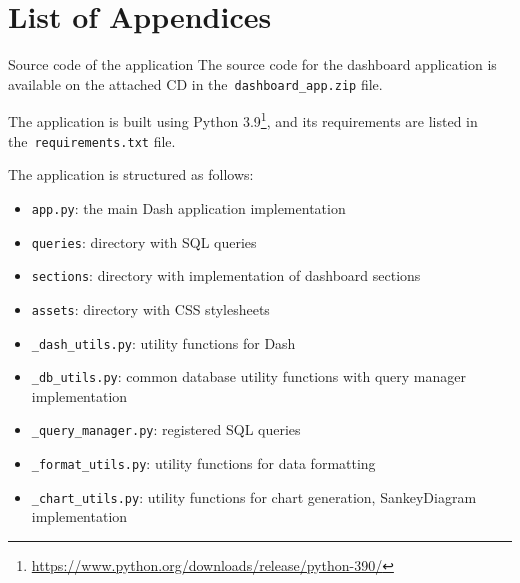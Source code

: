 \appendix
{}
\chapter*{List of Appendices}
\renewcommand{\thesection}{Appendix \Alph{section}}

\begin{section}{Source code of the application}
	\label{appendix:source-code}
	The source code for the dashboard application is available on the attached CD in the~\texttt{dashboard\_app.zip} file.

	The application is built using Python 3.9\footnote{\url{https://www.python.org/downloads/release/python-390/}}, and its requirements are listed in the~\texttt{requirements.txt} file.

	The application is structured as follows:
	\begin{itemize}
		\item \texttt{app.py}: the main Dash application implementation
		\item \texttt{queries\/}: directory with SQL queries
		\item \texttt{sections\/}: directory with implementation of dashboard sections
		\item \texttt{assets\/}: directory with CSS stylesheets
		\item \texttt{\_dash\_utils.py}: utility functions for Dash
		\item \texttt{\_db\_utils.py}: common database utility functions with query manager implementation
		\item \texttt{\_query\_manager.py}: registered SQL queries
		\item \texttt{\_format\_utils.py}: utility functions for data formatting
		\item \texttt{\_chart\_utils.py}: utility functions for chart generation, SankeyDiagram implementation
	\end{itemize}

\end{section}
\newpage
